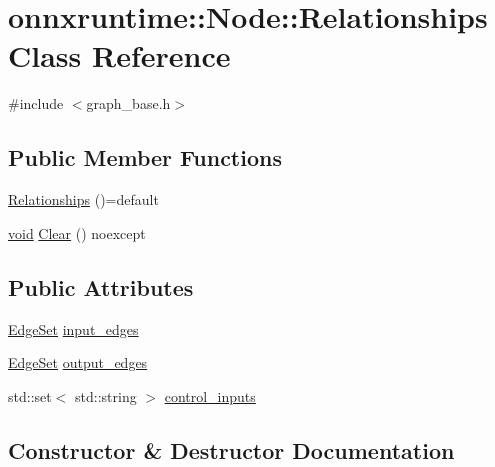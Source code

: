 \hypertarget{classonnxruntime_1_1Node_1_1Relationships}{}\section{onnxruntime\+:\+:Node\+:\+:Relationships Class Reference}
\label{classonnxruntime_1_1Node_1_1Relationships}


{\ttfamily \#include $<$graph\+\_\+base.\+h$>$}

\subsection*{Public Member Functions}
\begin{DoxyCompactItemize}
\item 
\mbox{\hyperlink{classonnxruntime_1_1Node_1_1Relationships_a127be100aab3c8b81846b9bfedbe3c78}{Relationships}} ()=default
\item 
\mbox{\hyperlink{mlasi_8h_a88f941d423cb2a819b70a1358982b1a6}{void}} \mbox{\hyperlink{classonnxruntime_1_1Node_1_1Relationships_a1ddb7b4776d60a3e4423cc02a4112069}{Clear}} () noexcept
\end{DoxyCompactItemize}
\subsection*{Public Attributes}
\begin{DoxyCompactItemize}
\item 
\mbox{\hyperlink{classonnxruntime_1_1Node_a96c203b69f604fcbe80532f9d939dcc6}{Edge\+Set}} \mbox{\hyperlink{classonnxruntime_1_1Node_1_1Relationships_af2b0f5c2d3c071d99cd5120a717699b8}{input\+\_\+edges}}
\item 
\mbox{\hyperlink{classonnxruntime_1_1Node_a96c203b69f604fcbe80532f9d939dcc6}{Edge\+Set}} \mbox{\hyperlink{classonnxruntime_1_1Node_1_1Relationships_afc504014c91de4ad25fecdd21c1d6a47}{output\+\_\+edges}}
\item 
std\+::set$<$ std\+::string $>$ \mbox{\hyperlink{classonnxruntime_1_1Node_1_1Relationships_a6c7d0231d65aa04f2f5e3ef85680792c}{control\+\_\+inputs}}
\end{DoxyCompactItemize}


\subsection{Constructor \& Destructor Documentation}
\mbox{\label{classonnxruntime_1_1Node_1_1Relationships_a127be100aab3c8b81846b9bfedbe3c78}} 
